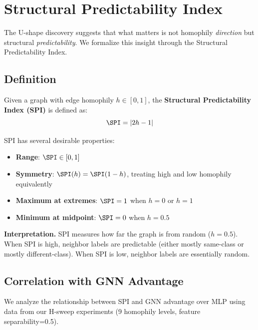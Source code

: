 
\section{Structural Predictability Index}
\label{sec:spi}

The U-shape discovery suggests that what matters is not homophily \textit{direction} but structural \textit{predictability}. We formalize this insight through the Structural Predictability Index.

\subsection{Definition}

\begin{definition}
Given a graph with edge homophily $h \in [0, 1]$, the \textbf{Structural Predictability Index (SPI)} is defined as:
\begin{equation}
    \SPI = |2h - 1|
\end{equation}
\end{definition}

SPI has several desirable properties:
\begin{itemize}
    \item \textbf{Range}: $\SPI \in [0, 1]$
    \item \textbf{Symmetry}: $\SPI(h) = \SPI(1-h)$, treating high and low homophily equivalently
    \item \textbf{Maximum at extremes}: $\SPI = 1$ when $h = 0$ or $h = 1$
    \item \textbf{Minimum at midpoint}: $\SPI = 0$ when $h = 0.5$
\end{itemize}

\textbf{Interpretation.} SPI measures how far the graph is from random ($h = 0.5$). When SPI is high, neighbor labels are predictable (either mostly same-class or mostly different-class). When SPI is low, neighbor labels are essentially random.

\subsection{Correlation with GNN Advantage}

We analyze the relationship between SPI and GNN advantage over MLP using data from our H-sweep experiments (9 homophily levels, feature separability=0.5).


